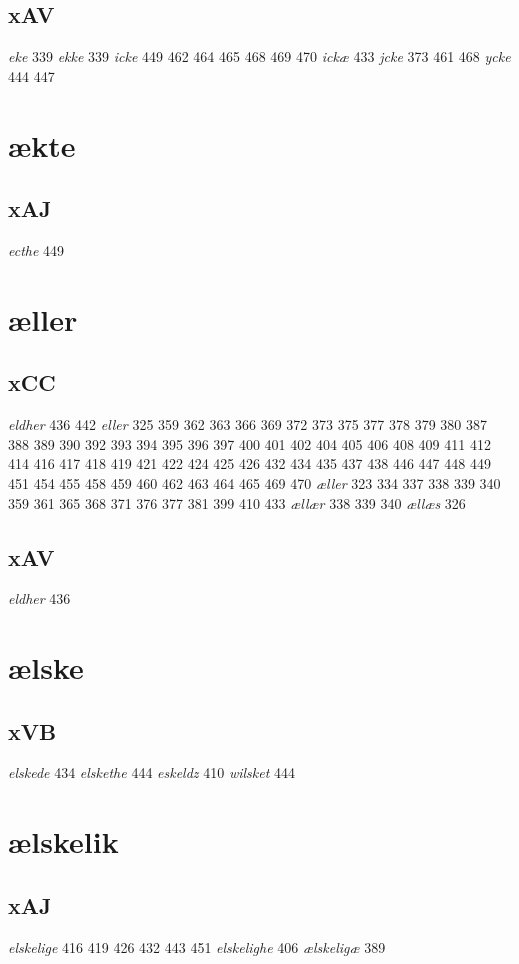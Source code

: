 \documentclass[a4paper,twocolumn]{article}
\begin{document}
\subsection{xAV}
\label{sec:org242bba4}
\emph{eke} 339 \emph{ekke} 339 \emph{icke} 449 462 464 465 468 469 470 \emph{ickæ} 433 \emph{jcke} 373 461 468 \emph{ycke} 444 447 
\section{ækte}
\label{sec:org205221f}
\subsection{xAJ}
\label{sec:org36b63f2}
\emph{ecthe} 449 
\section{æller}
\label{sec:org86301ec}
\subsection{xCC}
\label{sec:org8a7c37c}
\emph{eldher} 436 442 \emph{eller} 325 359 362 363 366 369 372 373 375 377 378 379 380 387 388 389 390 392 393 394 395 396 397 400 401 402 404 405 406 408 409 411 412 414 416 417 418 419 421 422 424 425 426 432 434 435 437 438 446 447 448 449 451 454 455 458 459 460 462 463 464 465 469 470 \emph{æller} 323 334 337 338 339 340 359 361 365 368 371 376 377 381 399 410 433 \emph{ællær} 338 339 340 \emph{ællæs} 326 
\subsection{xAV}
\label{sec:org4fb781b}
\emph{eldher} 436 
\section{ælske}
\label{sec:orgc4fac64}
\subsection{xVB}
\label{sec:org1fa8414}
\emph{elskede} 434 \emph{elskethe} 444 \emph{eskeldz} 410 \emph{wilsket} 444 
\section{ælskelik}
\label{sec:org97e88b8}
\subsection{xAJ}
\label{sec:org6df4e71}
\emph{elskelige} 416 419 426 432 443 451 \emph{elskelighe} 406 \emph{ælskeligæ} 389 
\end{document}

